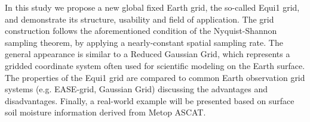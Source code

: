 \documentclass[20pt, a0paper, portrait]{tikzposter}
\begin{document}
\begin{columns}
{      In this study we propose a new global fixed Earth grid, the so-called
      Equi1 grid, and demonstrate its structure, usability and field of
      application. The grid construction follows the aforementioned condition of
      the Nyquist-Shannon sampling theorem, by applying a nearly-constant
      spatial sampling rate. The general appearance is similar to a Reduced
      Gaussian Grid, which represents a gridded coordinate system often used for
      scientific modeling on the Earth surface. The properties of the Equi1 grid
      are compared to common Earth observation grid systems (e.g. EASE-grid,
      Gaussian Grid) discussing the advantages and disadvantages. Finally, a
      real-world example will be presented based on surface soil moisture
      information derived from Metop ASCAT.}

  \end{columns}
\end{document}
